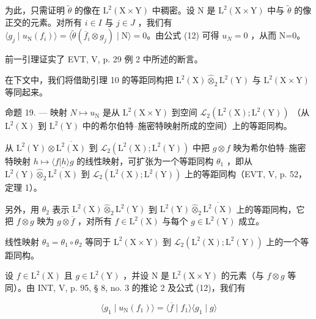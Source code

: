为此，只需证明 \(\widetilde{\theta}\) 的像在 \(\mathrm{L}^{2}(\mathrm{X}\times\mathrm{Y})\) 中稠密。设 N 是 \(\mathrm{L}^{2}(\mathrm{X}\times\mathrm{Y})\) 中与 \(\widetilde{\theta}\) 的像正交的元素。对所有 \(i\in I\) 与 \(j\in J\) ，我们有 \(\langle g_{j}\mid u_{\mathrm{N}}(f_{i})\rangle=\langle\widetilde{\theta}(\overline{f}_{i}\otimes g_{j})\mid\mathrm{N}\rangle=0\)。由公式 (12) 可得 \(u_{N}=0\) ，从而 N=0。

前一引理证实了 EVT, V, p. 29 例 2 中所述的断言。

在下文中，我们将借助引理 10 的等距同构把 \(\mathrm{L}^{2}(\mathrm{X})\widehat{\otimes}_{2}\mathrm{L}^{2}(\mathrm{Y})\) 与 \(\mathrm{L}^{2}(\mathrm{X}\times\mathrm{Y})\) 等同起来。

命题 19. --- 映射 \(N\mapsto u_{\mathrm{N}}\) 是从 \(\mathrm{L}^{2}(\mathrm{X}\times\mathrm{Y})\) 到空间 \(\mathcal{L}_{2}(\mathrm{L}^{2}(\mathrm{X});\mathrm{L}^{2}(\mathrm{Y}))\) （从 \(\mathrm{L}^{2}(\mathrm{X})\) 到 \(\mathrm{L}^{2}(\mathrm{Y})\) 中的希尔伯特--施密特映射所成的空间）上的等距同构。

从 \(\mathrm{L}^{2}(\mathrm{Y})\otimes\overline{\mathrm{L}^{2}(\mathrm{X})}\) 到 \(\mathcal{L}_{2}(\mathrm{L}^{2}(\mathrm{X});\mathrm{L}^{2}(\mathrm{Y}))\) 中把 \(g\otimes f\) 映为希尔伯特--施密特映射 \(h\mapsto\langle f|h\rangle g\) 的线性映射，可扩张为一个等距同构 \(\theta_{1}\) ，即从 \(\mathrm{L}^{2}(\mathrm{Y})\widehat{\otimes}_{2}\overline{\mathrm{L}^{2}(\mathrm{X})}\) 到 \(\mathcal{L}_{2}(\mathrm{L}^{2}(\mathrm{X});\mathrm{L}^{2}(\mathrm{Y}))\) 上的等距同构（EVT, V, p. 52，定理 1）。

另外，用 \(\theta_{2}\) 表示 \(\mathrm{L}^{2}(\mathrm{X})\widehat{\otimes}_{2}\mathrm{L}^{2}(\mathrm{Y})\) 到 \(\mathrm{L}^{2}(\mathrm{Y})\widehat{\otimes}_{2}\overline{\mathrm{L}^{2}(\mathrm{X})}\) 上的等距同构，它把 \(f\otimes g\) 映为 \(g\otimes \overline{f}\) ，对所有 \(f\in \mathrm{L}^2 (\mathrm{X})\) 与每个 \(g\in \mathrm{L}^2 (\mathrm{Y})\) 成立。

线性映射 \(\theta_{3} = \theta_{1} \circ \theta_{2}\) 等同于 \(\mathrm{L}^{2}(\mathrm{X} \times \mathrm{Y})\) 到 \(\mathcal{L}_{2}(\mathrm{L}^{2}(\mathrm{X}); \mathrm{L}^{2}(\mathrm{Y}))\) 上的一个等距同构。

设 \(f \in \mathrm{L}^2(\mathrm{X})\) 且 \(g \in \mathrm{L}^2(\mathrm{Y})\) ，并设 \(\mathrm{N}\) 是 \(\mathrm{L}^2(\mathrm{X} \times \mathrm{Y})\) 的元素（与 \(f \otimes g\) 等同）。由 INT, V, p. 95, § 8, no. 3 的推论 2 及公式 (12)，我们有

\[
\langle g _ {1} \mid u _ {\mathrm{N}} (f _ {1}) \rangle = \langle \overline {{f}} \mid f _ {1} \rangle \langle g _ {1} \mid g \rangle
\]

